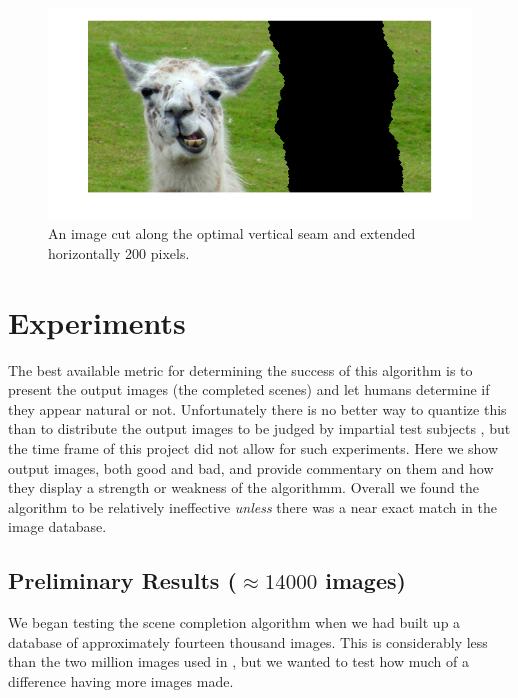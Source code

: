 \documentclass[11pt]{amsart}
\begin{document}
\begin{figure}[htbp]
\begin{center}
\includegraphics[scale=.4]{broken.png}
\caption{An image cut along the optimal vertical seam and extended horizontally 200 pixels.}
\label{llamaCut}
\end{center}
\end{figure}


\section{Experiments}

The best available metric for determining the success of this algorithm is to present the output images (the completed scenes) and let humans determine if they appear natural or not. Unfortunately there is no better way to quantize this than to distribute the output images to be judged by impartial test subjects \cite{Hays:2007}, but the time frame of this project did not allow for such experiments. Here we show output images, both good and bad, and provide commentary on them and how they display a strength or weakness of the algorithmm. Overall we found the algorithm to be relatively ineffective \emph{unless} there was a near exact match in the image database.

\subsection{Preliminary Results ($\approx14000$ images)}

We began testing the scene completion algorithm when we had built up a database of approximately fourteen thousand images. This is considerably less than the two million images used in \cite{Hays:2007}, but we wanted to test how much of a difference having more images made.
\end{document}
